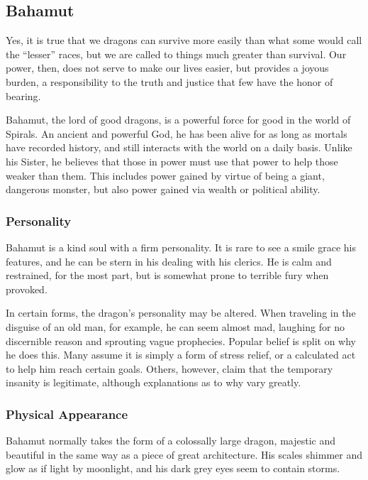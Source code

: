 \subsection*{Bahamut}
\begin{goddesc}
\end{goddesc}
\begin{itquote}
Yes, it is true that we dragons can survive more easily than what some would call the ``lesser'' races, but we are called to things much greater than survival.
Our power, then, does not serve to make our lives easier, but provides a joyous burden, a responsibility to the truth and justice that few have the honor of bearing. 
\end{itquote}
Bahamut, the lord of good dragons, is a powerful force for good in the world of Spirals.
An ancient and powerful God, he has been alive for as long as mortals have recorded history, and still interacts with the world on a daily basis.
Unlike his Sister, he believes that those in power must use that power to help those weaker than them.
This includes power gained by virtue of being a giant, dangerous monster, but also power gained via wealth or political ability.

\subsubsection*{Personality}
Bahamut is a kind soul with a firm personality.
It is rare to see a smile grace his features, and he can be stern in his dealing with his clerics.
He is calm and restrained, for the most part, but is somewhat prone to terrible fury when provoked.

In certain forms, the dragon's personality may be altered.
When traveling in the disguise of an old man, for example, he can seem almost mad, laughing for no discernible reason and sprouting vague prophecies.
Popular belief is split on why he does this.
Many assume it is simply a form of stress relief, or a calculated act to help him reach certain goals.
Others, however, claim that the temporary insanity is legitimate, although explanations as to why vary greatly.

\subsubsection*{Physical Appearance}
Bahamut normally takes the form of a colossally large dragon, majestic and beautiful in the same way as a piece of great architecture.
His scales shimmer and glow as if light by moonlight, and his dark grey eyes seem to contain storms.

